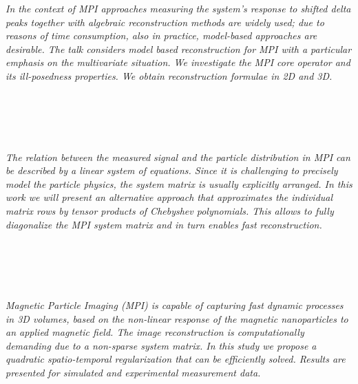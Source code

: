 \begin{multicols}{2}
      \textit{In the context of MPI approaches measuring the system's response to shifted delta peaks 
together with algebraic reconstruction methods are widely used;
due to reasons of time consumption, also in practice, model-based approaches are desirable.
The talk considers model based reconstruction for MPI with 
a particular emphasis on the multivariate situation. 
We investigate the MPI core operator and its ill-posedness properties.
We obtain reconstruction formulae in 2D and 3D.  }\\
\\ 
        \\
        \\\\
\\
      \textit{The relation between the measured signal and the particle distribution in MPI can be described by a linear system of equations. Since it is challenging to precisely model the particle physics, the system matrix is usually explicitly arranged. In this work we will present an alternative approach that approximates the individual matrix rows by tensor products of Chebyshev polynomials. This allows to fully diagonalize the MPI system matrix and in turn enables fast reconstruction.}\\
\\ 
        \\
        \\\\
\\
      \textit{Magnetic Particle Imaging (MPI) is capable of capturing fast dynamic processes in 3D volumes, based on the non-linear response of the magnetic nanoparticles to an applied magnetic field. The image reconstruction is computationally demanding due to a non-sparse system matrix. In this study we propose a quadratic spatio-temporal regularization that can be efficiently solved. Results are presented for simulated and experimental measurement data.}\\
\\ 
        \\
        \\\\
        \\
        \\\\
\\

\end{multicols}
